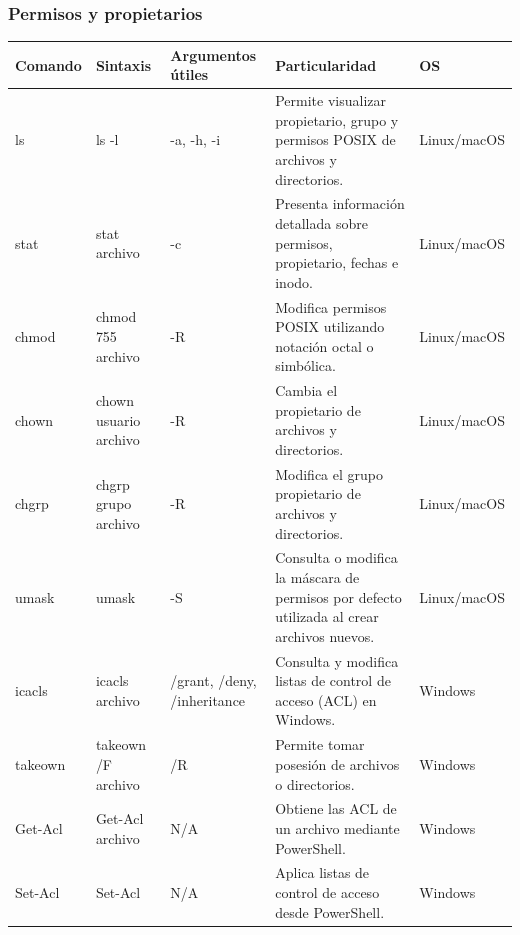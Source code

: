 \documentclass[a4paper,10pt]{article}
\begin{document}

\subsubsection{Permisos y propietarios}

\begin{longtable}{|p{2.8cm}|p{3.2cm}|p{4cm}|p{5.4cm}|p{1.5cm}|}

\hline
Comando &
Sintaxis &
Argumentos útiles &
Particularidad &
OS
\\
\hline
\endhead

ls &
ls -l &
-a, -h, -i &
Permite visualizar propietario, grupo y permisos POSIX de archivos y directorios. &
Linux/macOS
\\
\hline

stat &
stat archivo &
-c &
Presenta información detallada sobre permisos, propietario, fechas e inodo. &
Linux/macOS
\\
\hline

chmod &
chmod 755 archivo &
-R &
Modifica permisos POSIX utilizando notación octal o simbólica. &
Linux/macOS
\\
\hline

chown &
chown usuario archivo &
-R &
Cambia el propietario de archivos y directorios. &
Linux/macOS
\\
\hline

chgrp &
chgrp grupo archivo &
-R &
Modifica el grupo propietario de archivos y directorios. &
Linux/macOS
\\
\hline

umask &
umask &
-S &
Consulta o modifica la máscara de permisos por defecto utilizada al crear archivos nuevos. &
Linux/macOS
\\
\hline

icacls &
icacls archivo &
/grant, /deny, /inheritance &
Consulta y modifica listas de control de acceso (ACL) en Windows. &
Windows
\\
\hline

takeown &
takeown /F archivo &
/R &
Permite tomar posesión de archivos o directorios. &
Windows
\\
\hline

Get-Acl &
Get-Acl archivo &
N/A &
Obtiene las ACL de un archivo mediante PowerShell. &
Windows
\\
\hline

Set-Acl &
Set-Acl &
N/A &
Aplica listas de control de acceso desde PowerShell. &
Windows
\\
\hline

\end{longtable}
\end{document}
